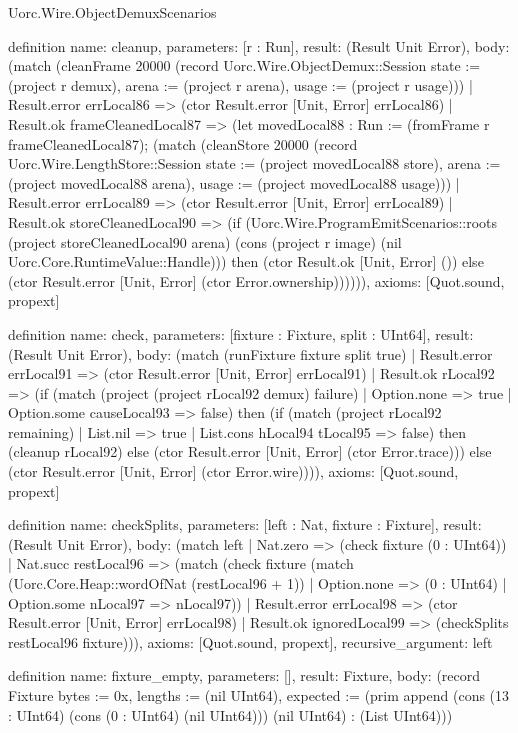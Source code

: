 \begin{lexlean}{Uorc.Wire.ObjectDemuxScenarios}
\begin{semanticmodule}
definition{
  name: cleanup,
  parameters: [r : Run],
  result: (Result Unit Error),
  body: (match (cleanFrame 20000 (record Uorc.Wire.ObjectDemux::Session {state := (project r demux), arena := (project r arena), usage := (project r usage)}))
    | Result.error errLocal86 => (ctor Result.error [Unit, Error] errLocal86)
    | Result.ok frameCleanedLocal87 => (let movedLocal88 : Run := (fromFrame r frameCleanedLocal87); (match (cleanStore 20000 (record Uorc.Wire.LengthStore::Session {state := (project movedLocal88 store), arena := (project movedLocal88 arena), usage := (project movedLocal88 usage)}))
      | Result.error errLocal89 => (ctor Result.error [Unit, Error] errLocal89)
      | Result.ok storeCleanedLocal90 => (if (Uorc.Wire.ProgramEmitScenarios::roots (project storeCleanedLocal90 arena) (cons (project r image) (nil Uorc.Core.RuntimeValue::Handle))) then (ctor Result.ok [Unit, Error] ()) else (ctor Result.error [Unit, Error] (ctor Error.ownership)))))),
  axioms: [Quot.sound, propext]
}

definition{
  name: check,
  parameters: [fixture : Fixture, split : UInt64],
  result: (Result Unit Error),
  body: (match (runFixture fixture split true)
    | Result.error errLocal91 => (ctor Result.error [Unit, Error] errLocal91)
    | Result.ok rLocal92 => (if (match (project (project rLocal92 demux) failure)
      | Option.none => true
      | Option.some causeLocal93 => false) then (if (match (project rLocal92 remaining)
      | List.nil => true
      | List.cons hLocal94 tLocal95 => false) then (cleanup rLocal92) else (ctor Result.error [Unit, Error] (ctor Error.trace))) else (ctor Result.error [Unit, Error] (ctor Error.wire)))),
  axioms: [Quot.sound, propext]
}

definition{
  name: checkSplits,
  parameters: [left : Nat, fixture : Fixture],
  result: (Result Unit Error),
  body: (match left
    | Nat.zero => (check fixture (0 : UInt64))
    | Nat.succ restLocal96 => (match (check fixture (match (Uorc.Core.Heap::wordOfNat (restLocal96 + 1))
        | Option.none => (0 : UInt64)
        | Option.some nLocal97 => nLocal97))
      | Result.error errLocal98 => (ctor Result.error [Unit, Error] errLocal98)
      | Result.ok ignoredLocal99 => (checkSplits restLocal96 fixture))),
  axioms: [Quot.sound, propext],
  recursive_argument: left
}

definition{
  name: fixture_empty,
  parameters: [],
  result: Fixture,
  body: (record Fixture {bytes := 0x, lengths := (nil UInt64), expected := (prim append (cons (13 : UInt64) (cons (0 : UInt64) (nil UInt64))) (nil UInt64) : (List UInt64))})
}


\end{semanticmodule}
\end{lexlean}
